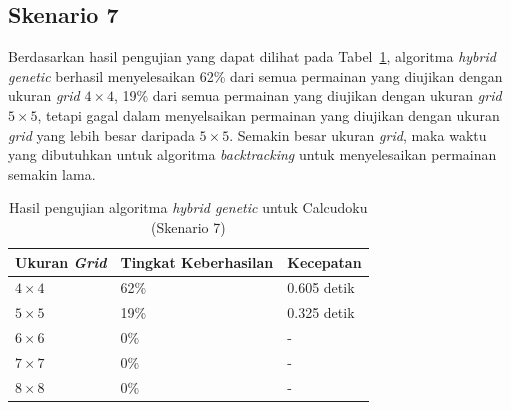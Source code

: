 \subsection{Skenario 7}
\label{sec:skenario7}

Berdasarkan hasil pengujian yang dapat dilihat pada Tabel~\ref{tab:pengujianhg7}, algoritma \textit{hybrid genetic} berhasil menyelesaikan 62\% dari semua permainan yang diujikan dengan ukuran \textit{grid} \begin{math}4 \times 4\end{math}, 19\% dari semua permainan yang diujikan dengan ukuran \textit{grid} \begin{math}5 \times 5\end{math}, tetapi gagal dalam menyelsaikan permainan yang diujikan dengan ukuran \textit{grid} yang lebih besar daripada \begin{math}5 \times 5\end{math}. Semakin besar ukuran \textit{grid}, maka waktu yang dibutuhkan untuk algoritma \textit{backtracking} untuk menyelesaikan permainan semakin lama.

\begin{table}
\centering
\captionsetup{justification=centering}
\caption[Hasil pengujian algoritma \textit{hybrid genetic} untuk Calcudoku (Skenario 7)]{Hasil pengujian algoritma \textit{hybrid genetic} untuk Calcudoku (Skenario 7)}
\begin{tabular}{| l | l | l |}
\hline
Ukuran \textit{Grid} & Tingkat Keberhasilan & Kecepatan \\
\hline \hline
\begin{math}4 \times 4\end{math} & 62\% & 0.605 detik \\
\hline
\begin{math}5 \times 5\end{math} & 19\% & 0.325 detik \\
\hline
\begin{math}6 \times 6\end{math} & 0\% & - \\
\hline
\begin{math}7 \times 7\end{math} & 0\% & - \\
\hline
\begin{math}8 \times 8\end{math} & 0\% & - \\
\hline
\end{tabular}
\label{tab:pengujianhg7}
\end{table}

